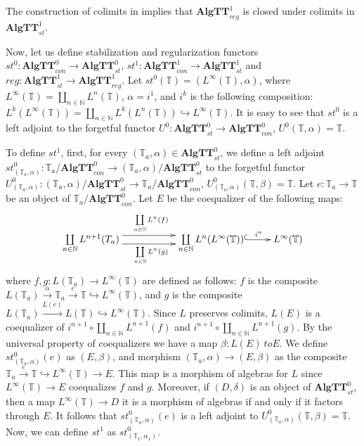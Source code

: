 \documentclass[reqno]{amsart}
\theoremstyle{definition}
\theoremstyle{remark}
\newcommand{\cat}[1]{\mathbf{#1}}
\newcommand{\algtt}{\cat{AlgTT}}
\numberwithin{figure}{section}
\begin{document}
The construction of colimits in  implies that $\algtt^1_{reg}$ is closed under colimits in $\algtt^1_{st}$.

Now, let us define stabilization and regularization functors $st^0 : \algtt^0_{con} \to \algtt^0_{st}$,
    $st^1 : \algtt^1_{con} \to \algtt^1_{st}$ and $reg : \algtt^1_{st} \to \algtt^1_{reg}$.
Let $st^0(\mathbb{T}) = (L^\infty(\mathbb{T}), \alpha)$, where $L^\infty(\mathbb{T}) = \coprod\limits_{n \in \mathbb{N}} L^n(\mathbb{T})$, $\alpha = i^1$, and $i^k$ is the following composition:
    $L^k(L^\infty(\mathbb{T})) = \coprod\limits_{n \in \mathbb{N}} L^k(L^n(\mathbb{T})) \hookrightarrow L^\infty(\mathbb{T})$.
It is easy to see that $st^0$ is a left adjoint to the forgetful functor $U^0 : \algtt^0_{st} \to \algtt^0_{con}$, $U^0(\mathbb{T},\alpha) = \mathbb{T}$.

To define $st^1$, first, for every $(\mathbb{T}_a,\alpha) \in \algtt^0_{st}$, we define a left adjoint $st^0_{(\mathbb{T}_a,\alpha)} : \mathbb{T}_a/\algtt^0_{con} \to (\mathbb{T}_a,\alpha)/\algtt^0_{st}$
    to the forgetful functor $U^0_{(\mathbb{T}_a,\alpha)} : (\mathbb{T}_a,\alpha)/\algtt^0_{st} \to \mathbb{T}_a/\algtt^0_{con}$,
    $U^0_{(\mathbb{T}_a,\alpha)}(\mathbb{T},\beta) = \mathbb{T}$.
Let $e : \mathbb{T}_a \to \mathbb{T}$ be an object of $\mathbb{T}_a/\algtt^0_{con}$.
Let $E$ be the coequalizer of the following maps:
\[ \xymatrix{ \coprod\limits_{n \in \mathbb{N}} L^{n+1}(T_a) \ar@<+1ex>[rr]^{\coprod\limits_{n \in \mathbb{N}} L^n(f)} \ar@<-1ex>[rr]_{\coprod\limits_{n \in \mathbb{N}} L^n(g)}
    & & \coprod\limits_{n \in \mathbb{N}} L^n(L^\infty(\mathbb{T})) \ar@{^{(}->}[r]^-{i^n} & L^\infty(\mathbb{T}) } \]
    where $f,g : L(\mathbb{T}_a) \to L^\infty(\mathbb{T})$ are defined as follows: $f$ is the composite $L(\mathbb{T}_a) \xrightarrow{\alpha} \mathbb{T}_a \xrightarrow{e} \mathbb{T} \hookrightarrow L^\infty(\mathbb{T})$,
    and $g$ is the composite $L(\mathbb{T}_a) \xrightarrow{L(e)} L(\mathbb{T}) \hookrightarrow L^\infty(\mathbb{T})$.
Since $L$ preserves colimits, $L(E)$ is a coequalizer of $i^{n+1} \circ \coprod_{n \in \mathbb{N}} L^{n+1}(f)$ and $i^{n+1} \circ \coprod_{n \in \mathbb{N}} L^{n+1}(g)$.
By the universal property of coequalizers we have a map $\beta : L(E) \ to E$.
We define $st^0_{(\mathbb{T}_a,\alpha)}(e)$ as $(E,\beta)$, and morphism $(\mathbb{T}_a,\alpha) \to (E,\beta)$ as the composite $\mathbb{T}_a \xrightarrow{e} \mathbb{T} \hookrightarrow L^\infty(\mathbb{T}) \to E$.
This map is a morphism of algebras for $L$ since $L^\infty(\mathbb{T}) \to E$ coequalizes $f$ and $g$.
Moreover, if $(D,\delta)$ is an object of $\algtt^0_{st}$, then a map $L^\infty(\mathbb{T}) \to D$ it is a morphism of algebras if and only if it factors through $E$.
It follows that $st^0_{(\mathbb{T}_a,\alpha)}(e)$ is a left adjoint to $U^0_{(\mathbb{T}_a,\alpha)}(\mathbb{T},\beta) = \mathbb{T}$.
Now, we can define $st^1$ as $st^0_{(\mathbb{T}_1,\alpha_1)}$.
\end{document}
